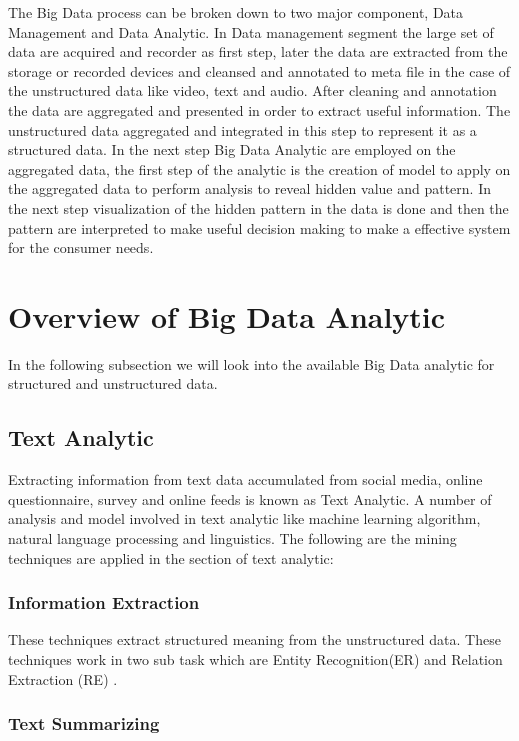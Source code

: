 \documentclass[sigconf]{acmart}
\begin{document}
The Big Data process can be broken down to two major component, Data Management and Data Analytic. In Data management segment the large set of data are acquired and recorder as first step, later the data are extracted from the storage or recorded devices and cleansed and annotated to meta file in the case of the unstructured data like video, text and audio. After cleaning and annotation the data are aggregated and presented in order to extract useful information. The unstructured data aggregated and integrated in this step to represent it as a structured data. In the next step Big Data Analytic are employed on the aggregated data, the first step of the analytic is the creation of model to apply on the aggregated data to perform analysis to reveal hidden value and pattern. In the next step visualization of the hidden pattern in the data is done and then the pattern are interpreted to make useful decision making to make a effective system for the consumer needs.
 
 \section{Overview of Big Data Analytic}
 In the following subsection we will look into the available Big Data analytic for structured and unstructured data.
 
 \subsection{Text Analytic}
 
 Extracting information from text data accumulated from social media, online questionnaire, survey and online feeds is known as Text Analytic. A number of analysis and model involved in text analytic like machine learning algorithm, natural language processing and linguistics. The following are the mining techniques are applied in the section of text analytic:
 
 
\subsubsection{Information Extraction}

These techniques extract structured meaning from the unstructured data. These techniques work in two sub task which are Entity Recognition(ER) \cite{bigdata} and Relation Extraction (RE) \cite{bigdata}.

\subsubsection{Text Summarizing}
\end{document}
